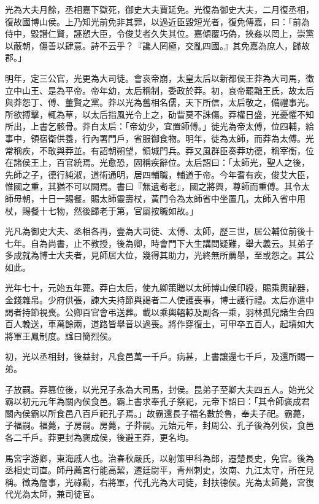 \begin{pinyinscope}
光為大夫月餘，丞相嘉下獄死，御史大夫賈延免。光復為御史大夫，二月復丞相，復故國博山侯。上乃知光前免非其罪，以過近臣毀短光者，復免傅嘉，曰：「前為侍中，毀譖仁賢，誣愬大臣，令俊艾者久失其位。嘉傾覆巧偽，挾姦以罔上，崇黨以蔽朝，傷善以肆意。詩不云乎？『讒人罔極，交亂四國。』其免嘉為庶人，歸故郡。」

明年，定三公官，光更為大司徒。會哀帝崩，太皇太后以新都侯王莽為大司馬，徵立中山王、是為平帝。帝年幼，太后稱制，委政於莽。初，哀帝罷黜王氏，故太后與莽怨丁、傅、董賢之黨。莽以光為舊相名儒，天下所信，太后敬之，備禮事光。所欲搏擊，輒為草，以太后指風光令上之，劯眥莫不誅傷。莽權日盛，光憂懼不知所出，上書乞骸骨。莽白太后：「帝幼少，宜置師傅。」徙光為帝太傅，位四輔，給事中，領宿衛供養，行內署門戶，省服御食物。明年，徙為太師，而莽為太傅。光常稱疾，不敢與莽並。有詔朝朔望，領城門兵。莽又風群臣奏莽功德，稱宰衡，位在諸侯王上，百官統焉。光愈恐，固稱疾辭位。太后詔曰：「太師光，聖人之後，先師之子，德行純淑，道術通明，居四輔職，輔道于帝。今年耆有疾，俊艾大臣，惟國之重，其猶不可以闕焉。書曰『無遺耇老』，國之將興，尊師而重傅。其令太師毋朝，十日一賜餐。賜太師靈壽杖，黃門令為太師省中坐置几，太師入省中用杖，賜餐十七物，然後歸老于第，官屬按職如故。」

光凡為御史大夫、丞相各再，壹為大司徒、太傅、太師，歷三世，居公輔位前後十七年。自為尚書，止不教授，後為卿，時會門下大生講問疑難，舉大義云。其弟子多成就為博士大夫者，見師居大位，幾得其助力，光終無所薦舉，至或怨之。其公如此。

光年七十，元始五年薨。莽白太后，使九卿策贈以太師博山侯印綬，賜乘輿祕器，金錢雜帛。少府供張，諫大夫持節與謁者二人使護喪事，博士護行禮。太后亦遣中謁者持節視喪。公卿百官會弔送葬。載以乘輿轀輬及副各一乘，羽林孤兒諸生合四百人輓送，車萬餘兩，道路皆舉音以過喪。將作穿復土，可甲卒五百人，起墳如大將軍王鳳制度。諡曰簡烈侯。

初，光以丞相封，後益封，凡食邑萬一千戶。病甚，上書讓還七千戶，及還所賜一弟。

子放嗣。莽篡位後，以光兄子永為大司馬，封侯。昆弟子至卿大夫四五人。始光父霸以初元元年為關內侯食邑。霸上書求奉孔子祭祀，元帝下詔曰：「其令師褒成君關內侯霸以所食邑八百戶祀孔子焉。」故霸還長子福名數於魯，奉夫子祀。霸薨，子福嗣。福薨，子房嗣。房薨，子莽嗣。元始元年，封周公、孔子後為列侯，食邑各二千戶。莽更封為褒成侯，後避王莽，更名均。

馬宮字游卿，東海戚人也。治春秋嚴氏，以射策甲科為郎，遷楚長史，免官。後為丞相史司直。師丹薦宮行能高絜，遷廷尉平，青州刺史，汝南、九江太守，所在見稱。徵為詹事，光祿勳，右將軍，代孔光為大司徒，封扶德侯。光為太師薨，宮復代光為太師，兼司徒官。


\end{pinyinscope}

